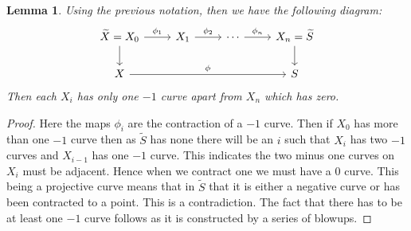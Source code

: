 \documentclass[11pt]{amsart}
\theoremstyle{plain}
\newtheorem{lem}[thm]{Lemma}
\newcommand{\wt}[1]{\widetilde{#1}}
\begin{document}
 
 
\begin{lem}\label{onecurve}
Using the previous notation, then we have the following diagram:
\[
\begin{tikzcd}
\wt{X}  = X_0 \arrow[r, "\phi_1"] \arrow[d] & X_1 \arrow[r, "\phi_2"] & \cdots \arrow[r, "\phi_n"] & X_n = \wt{S} \arrow[d] \\
X \arrow[rrr, "\phi"]                      &               &                            & S                     
\end{tikzcd}
\]
Then each $X_i$ has only one $-1$ curve apart from $X_n$ which has zero.
\end{lem}
\begin{proof}


Here the maps $\phi_i$ are the contraction of a $-1$ curve. Then if $X_0$ has more than one $-1$ curve then as $\wt{S}$ has none there will be an $i$ such that $X_i$ has two $-1$ curves and $X_{i-1}$ has one $-1$ curve. This indicates the two minus one curves on $X_i$ must be adjacent. Hence when we contract one we must have a $0$ curve. This being a projective curve means that in $\wt{S}$ that it is either a negative curve or has been contracted to a point. This is a contradiction. The fact that there has to be at least one $-1$ curve follows as it is constructed by a series of blowups.
\end{proof}
 
\end{document}
